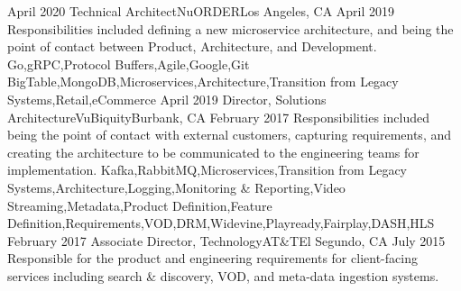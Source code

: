 %
%
%

\begin{experiences}
  \experience
    {April 2020}   {Technical Architect}{NuORDER}{Los Angeles, CA}
    {April 2019}
    {
      Responsibilities included defining a new microservice architecture, and being the point of contact between Product, Architecture, and Development.
                    }
                    {
                      Go,gRPC,Protocol Buffers,Agile,Google,Git BigTable,MongoDB,Microservices,Architecture,Transition from Legacy Systems,Retail,eCommerce
                  }
  \emptySeparator
  \experience
    {April 2019} {Director, Solutions Architecture}{VuBiquity}{Burbank, CA}
    {February 2017}    {
      Responsibilities included being the point of contact with external customers, capturing requirements, and creating the architecture to be communicated to the engineering teams for implementation.
                    }
                    {Kafka,RabbitMQ,Microservices,Transition from Legacy Systems,Architecture,Logging,Monitoring \& Reporting,Video Streaming,Metadata,Product Definition,Feature Definition,Requirements,VOD,DRM,Widevine,Playready,Fairplay,DASH,HLS}
  \emptySeparator
  \experience
    {February 2017}     {Associate Director, Technology}{AT\&T}{El Segundo, CA}
    {July 2015}    {
      Responsible for the product and engineering requirements for client-facing services including search \& discovery, VOD, and meta-data ingestion systems.
}
\end{experiences}
